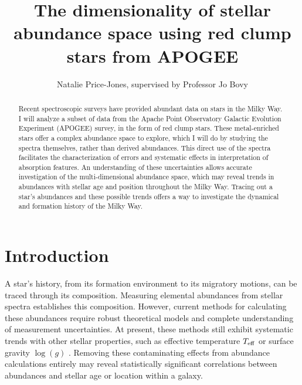 \documentclass[preprint]{aastex}
\begin{document}
\title{The dimensionality of stellar abundance space using red clump stars from APOGEE}
\author{Natalie Price-Jones, supervised by Professor Jo Bovy}

\begin{abstract}
Recent spectroscopic surveys have provided abundant data on stars in the Milky Way. I will analyze a subset of data from the Apache Point Observatory Galactic Evolution Experiment (APOGEE) survey, in the form of red clump stars. These metal-enriched stars offer a complex abundance space to explore, which I will do by studying the spectra themselves, rather than derived abundances. This direct use of the spectra facilitates the characterization of errors and systematic effects in interpretation of absorption features. An understanding of these uncertainties allows accurate investigation of the multi-dimensional abundance space, which may reveal trends in abundances with stellar age and position throughout the Milky Way. Tracing out a star's abundances and these possible trends offers a way to investigate the dynamical and formation history of the Milky Way.


\end{abstract}

\section{Introduction}
\label{sec:back}
A star's history, from its formation environment to its migratory motions, can be traced through its composition. Measuring elemental abundances from stellar spectra establishes this composition. However, current methods for calculating these abundances require robust theoretical models and complete understanding of measurement uncertainties. At present, these methods still exhibit systematic trends with other stellar properties, such as effective temperature $T_{\rm eff}$ or surface gravity $\log(g)$ \citep{holtzman2015}. Removing these contaminating effects from abundance calculations entirely may reveal statistically significant correlations between abundances and stellar age or location within a galaxy. 
\end{document}

